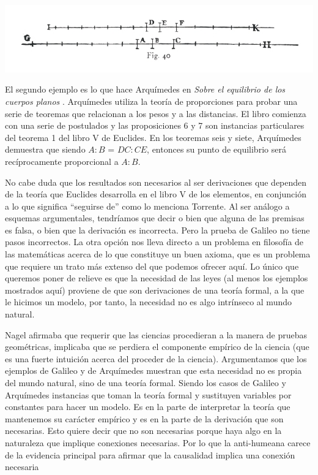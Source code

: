 \includegraphics[width=\textwidth]{fig40.jpg}

El segundo ejemplo es lo que hace Arquímedes en \emph{Sobre el equilibrio de los cuerpos planos} \cite{Archimedes1897}. Arquímedes utiliza la teoría de proporciones para probar una serie de teoremas que relacionan a los pesos y a las distancias. El libro comienza con una serie de postulados y las proposiciones 6 y 7 son instancias particulares del teorema 1 del libro V de Euclides. En los teoremas seis y siete, Arquímedes demuestra que siendo $A:B$ = $DC:CE$, entonces su punto de equilibrio será recíprocamente proporcional a $A:B$.

No cabe duda que los resultados son necesarios al ser derivaciones que dependen de la teoría que Euclides desarrolla en el libro V de los elementos, en conjunción a lo que significa ``seguirse de'' como lo menciona Torrente. Al ser análogo a esquemas argumentales, tendríamos que decir o bien que alguna de las premisas es falsa, o bien que la derivación es incorrecta. Pero la prueba de Galileo no tiene pasos incorrectos. La otra opción nos lleva directo a un problema en filosofía de las matemáticas acerca de lo que constituye un buen axioma, que es un problema que requiere un trato más extenso del que podemos ofrecer aquí. Lo único que queremos poner de relieve es que la necesidad de las leyes (al menos los ejemplos mostrados aquí) proviene de que son derivaciones de una teoría formal, a la que le hicimos un modelo, por tanto, la necesidad no es algo intrínseco al mundo natural.


Nagel afirmaba que requerir que las ciencias procedieran a la manera de pruebas geométricas, implicaba que se perdiera el componente empírico de la ciencia (que es una fuerte intuición acerca del proceder de la ciencia). Argumentamos que los ejemplos de Galileo y de Arquímedes muestran que esta necesidad no es propia del mundo natural, sino de una teoría formal. Siendo los casos de Galileo y Arquímedes instancias que toman la teoría formal y  sustituyen variables por constantes para hacer un modelo. Es en la parte de interpretar la teoría que mantenemos su carácter empírico y es en la parte de la derivación que son necesarias. Esto quiere decir que no son necesarias porque haya algo en la naturaleza que implique conexiones necesarias. Por lo que la anti-humeana carece de la evidencia principal para afirmar que la causalidad implica una conexión necesaria

